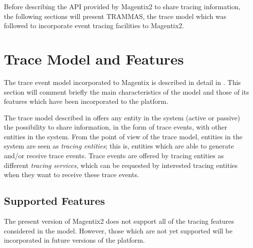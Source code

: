 	Before describing the API provided by Magentix2 to share tracing information, the following sections
	will present TRAMMAS, the trace model which was followed to incorporate event tracing facilities to
	Magentix2.


\section{Trace Model and Features}

	The trace event model incorporated to Magentix is described in detail in \cite{Burdalo10}.
	This section will comment briefly the main characteristics of the model and those of its features which
	have been incorporated to the platform.

	The trace model described in \cite{Burdalo10} offers any entity in the system (active or
	passive) the possibility to share information, in the form of trace events, with other entities in the
	system. From the point of view of the trace model, entities in the system are seen as \textit{tracing
	entities}; this is, entities which are able to generate and/or receive trace events. Trace events are
	offered by tracing entities as different \textit{tracing services}, which can be requested by interested
	tracing entities when they want to receive these trace events.

	\subsection{Supported Features}

		The present version of Magentix2 does not support all of the tracing features considered in the
		model. However, those which are not yet supported will be incorporated in future versions of the platform.

